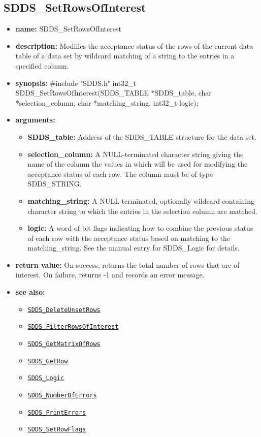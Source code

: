 \documentclass[11pt]{article}
\newcommand{\progref}[1]{\hyperref[SDDS_#1]{\tt SDDS\_#1}}
\begin{document}
\subsection{SDDS\_SetRowsOfInterest}
\label{SDDS_SetRowsOfInterest}

\begin{itemize}
\item {\bf name:}\newline
SDDS\_SetRowsOfInterest
\item {\bf description:}\newline
Modifies the acceptance status of the rows of the current data table of a data set by wildcard matching of a string to the entries in a specified column.
\item {\bf synopsis:} \#include "SDDS.h"\newline
int32\_t SDDS\_SetRowsOfInterest(SDDS\_TABLE *SDDS\_table, char *selection\_column, char *matching\_string, int32\_t logic);
\item {\bf arguments:}
\begin{itemize}
\item {\bf SDDS\_table:} Address of the SDDS\_TABLE structure for the data set.
\item {\bf selection\_column:} A NULL-terminated character string giving the name of the column the values in which will be used for modifying the acceptance status of each row. The column must be of type SDDS\_STRING.
\item {\bf matching\_string:} A NULL-terminated, optionally wildcard-containing character string to which the entries in the selection column are matched.
\item {\bf logic:} A word of bit flags indicating how to combine the previous status of each row with the acceptance status based on matching to the matching\_string. See the manual entry for SDDS\_Logic for details.
\end{itemize}
\item {\bf return value:}\newline
On success, returns the total number of rows that are of interest. On failure, returns -1 and records an error message.
\item {\bf see also:}
\begin{itemize}
\item \progref{DeleteUnsetRows}
\item \progref{FilterRowsOfInterest}
\item \progref{GetMatrixOfRows}
\item \progref{GetRow}
\item \progref{Logic}
\item \progref{NumberOfErrors}
\item \progref{PrintErrors}
\item \progref{SetRowFlags}
\end{itemize}
\end{itemize}
\end{document}
